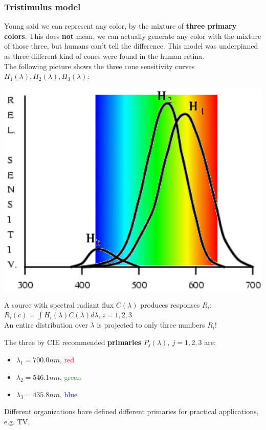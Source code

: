 \documentclass[a4paper, fontsize=8pt, landscape, DIV=1]{scrartcl}
\begin{document}
\begin{multicols*}{4}
		\subsubsection{Tristimulus model}
		Young said we can represent any color, by the mixture of \textbf{three primary colors}. This does \textbf{not} mean, we can actually generate any color with the mixture of those three, but humans can't tell the difference. This model was underpinned as three different kind of cones were found in the human retina.\\
		The following picture shows the three cone sensitivity curves $H_1(\lambda), H_2(\lambda), H_3(\lambda)$:
		\begin{center}
			\includegraphics[width=0.8\columnwidth]{images/FeatureExt/cone_sensit.png}\\
		\end{center}
		A source with spectral radiant flux $C(\lambda)$ produces responses $R_i$:\\
		$R_i(c)=\int H_i(\lambda)C(\lambda)d\lambda$, $i=1,2,3$\\
		An entire distribution over $\lambda$ is projected to only three numbers $R_i$!
		\par 
		The three by CIE recommended \textbf{primaries} $P_j(\lambda),\ j=1,2,3$ are: 
		\begin{itemize}[noitemsep]
			\item $\lambda_1=700.0nm$, \textcolor{red}{red}
			\item $\lambda_2=546.1nm$, \textcolor{ForestGreen}{green}
			\item $\lambda_3=435.8nm$, \textcolor{blue}{blue}
		\end{itemize}
		Different organizations have defined different primaries for practical applications, e.g. TV.\\

\end{multicols*}
\end{document}
